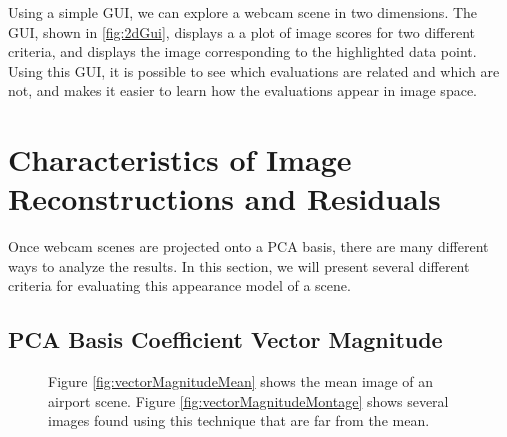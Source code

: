 Using a simple GUI, we can explore a webcam scene in two dimensions.  The GUI, shown in \ref{fig:2dGui}, displays a a plot of image scores for two different criteria, and displays the image corresponding to the highlighted data point.  Using this GUI, it is possible to see which evaluations are related and which are not, and makes it easier to learn how the evaluations appear in image space.


\section{Characteristics of Image Reconstructions and Residuals}

Once webcam scenes are projected onto a PCA basis, there are many different ways to analyze the results.  In this section, we will present several different criteria for evaluating this appearance model of a scene.

\subsection{PCA Basis Coefficient Vector Magnitude}

\begin{figure}
	\centering
		\caption[PCA Basis Coefficient Vector Magnitude.]{Figure \ref{fig:vectorMagnitudeMean} shows the mean image of an airport scene. Figure \ref{fig:vectorMagnitudeMontage} shows several images found using this technique that are far from the mean.}
\end{figure}

